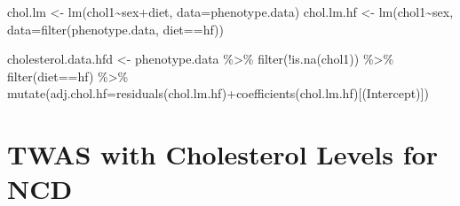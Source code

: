 \documentclass[
]{article}
\newenvironment{Shaded}{\begin{snugshade}}{\end{snugshade}}
\newcommand{\AttributeTok}[1]{\textcolor[rgb]{0.77,0.63,0.00}{#1}}
\newcommand{\FunctionTok}[1]{\textcolor[rgb]{0.00,0.00,0.00}{#1}}
\newcommand{\NormalTok}[1]{#1}
\newcommand{\OtherTok}[1]{\textcolor[rgb]{0.56,0.35,0.01}{#1}}
\newcommand{\SpecialCharTok}[1]{\textcolor[rgb]{0.00,0.00,0.00}{#1}}
\newcommand{\StringTok}[1]{\textcolor[rgb]{0.31,0.60,0.02}{#1}}
\begin{document}
\begin{Shaded}
\begin{Highlighting}[]
\NormalTok{chol.lm }\OtherTok{\textless{}{-}} \FunctionTok{lm}\NormalTok{(chol1}\SpecialCharTok{\textasciitilde{}}\NormalTok{sex}\SpecialCharTok{+}\NormalTok{diet, }\AttributeTok{data=}\NormalTok{phenotype.data)}
\NormalTok{chol.lm.hf }\OtherTok{\textless{}{-}} \FunctionTok{lm}\NormalTok{(chol1}\SpecialCharTok{\textasciitilde{}}\NormalTok{sex, }\AttributeTok{data=}\FunctionTok{filter}\NormalTok{(phenotype.data, diet}\SpecialCharTok{==}\StringTok{\textquotesingle{}hf\textquotesingle{}}\NormalTok{))}

\NormalTok{cholesterol.data.hfd }\OtherTok{\textless{}{-}}
\NormalTok{  phenotype.data }\SpecialCharTok{\%\textgreater{}\%}
    \FunctionTok{filter}\NormalTok{(}\SpecialCharTok{!}\FunctionTok{is.na}\NormalTok{(chol1)) }\SpecialCharTok{\%\textgreater{}\%}
  \FunctionTok{filter}\NormalTok{(diet}\SpecialCharTok{==}\StringTok{\textquotesingle{}hf\textquotesingle{}}\NormalTok{) }\SpecialCharTok{\%\textgreater{}\%}
  \FunctionTok{mutate}\NormalTok{(}\AttributeTok{adj.chol.hf=}\FunctionTok{residuals}\NormalTok{(chol.lm.hf)}\SpecialCharTok{+}\FunctionTok{coefficients}\NormalTok{(chol.lm.hf)[}\StringTok{\textquotesingle{}(Intercept)\textquotesingle{}}\NormalTok{])}
\end{Highlighting}
\end{Shaded}

\hypertarget{twas-with-cholesterol-levels-for-ncd}{%
\section{TWAS with Cholesterol Levels for
NCD}\label{twas-with-cholesterol-levels-for-ncd}}
\end{document}
